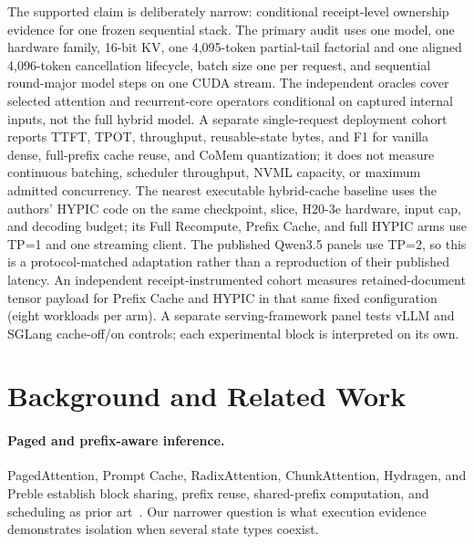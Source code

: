 \documentclass{article}
\begin{document}
The supported claim is deliberately narrow: conditional receipt-level
ownership evidence for one frozen sequential stack.  The primary audit uses one model, one hardware
family, 16-bit KV, one 4,095-token partial-tail factorial and one aligned
4,096-token cancellation lifecycle, batch size one per request, and sequential
round-major model steps on one CUDA stream.  The
independent oracles cover selected attention and recurrent-core operators
conditional on captured internal inputs, not the full hybrid model.  A separate
single-request deployment cohort reports TTFT, TPOT, throughput, reusable-state
bytes, and F1 for vanilla dense, full-prefix cache reuse, and CoMem quantization;
it does not measure continuous batching, scheduler throughput, NVML capacity,
or maximum admitted concurrency.  The nearest executable hybrid-cache baseline
uses the authors' HYPIC code on the same checkpoint, slice, H20-3e hardware,
input cap, and decoding budget; its Full Recompute, Prefix Cache, and full
HYPIC arms use TP=1 and one streaming client.  The published Qwen3.5 panels use
TP=2, so this is a protocol-matched adaptation rather than a reproduction of
their published latency.  An independent receipt-instrumented cohort measures
retained-document tensor payload for Prefix Cache and HYPIC in that same fixed
configuration (eight workloads per arm).  A separate serving-framework panel
tests vLLM and SGLang cache-off/on controls; each experimental block is
interpreted on its own.

\section{Background and Related Work}
\label{sec:related}

\paragraph{Paged and prefix-aware inference.}
PagedAttention, Prompt Cache, RadixAttention, ChunkAttention, Hydragen, and
Preble establish block sharing, prefix reuse, shared-prefix computation, and
scheduling as prior art~\citep{kwon2023pagedattention,gim2024promptcache,
zheng2024sglang,ye2024chunkattention,juravsky2024hydragen,srivatsa2025preble}.
Our narrower question is what execution evidence demonstrates isolation when
several state types coexist.
\end{document}
